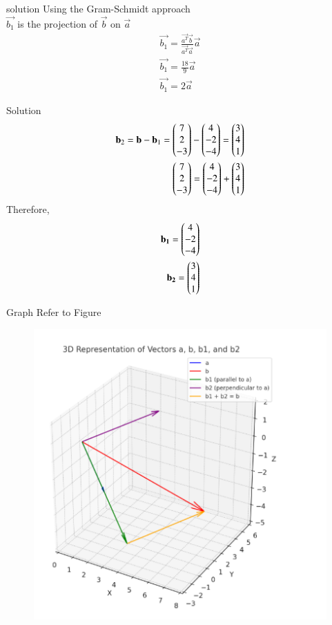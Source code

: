 \documentclass{beamer}
\begin{document}
\begin{frame}{solution}
Using the Gram-Schmidt approach\\
$\vec{{b}_1}$ is the projection of $\vec{b}$ on $\vec{a}$
\begin{align}
 \vec{{b}_1} = \frac{\vec{a^T} \vec{b}}{\vec{a^T} \vec{a}}  \vec{a}\\
\vec{{b}_1}=\frac{18}{9} \vec{a}\\
\vec{{b}_1}=2\vec{a}
\end{align}
\end{frame}
\begin{frame}{Solution}
\begin{align}
\mathbf{b}_2 = \mathbf{b} - \mathbf{b}_1 
= \begin{pmatrix}
7 \\ 2 \\ -3
\end{pmatrix}
-
\begin{pmatrix}
4 \\ -2 \\ -4
\end{pmatrix}
= \begin{pmatrix}
3 \\ 4 \\ 1\end{pmatrix}\\
 \begin{pmatrix}
7 \\ 2 \\ -3
\end{pmatrix}
=
\begin{pmatrix}
4 \\ -2 \\ -4
\end{pmatrix}
+
 \begin{pmatrix}
3 \\ 4 \\ 1\end{pmatrix}
\end{align}
Therefore,
\begin{align}
  \mathbf{{b}_1}=\begin{pmatrix}
                   4 \\ -2 \\ -4
                    \end{pmatrix}\\
\mathbf{{b}_2}= \begin{pmatrix}
             3 \\ 4 \\ 1  \end{pmatrix}    
\end{align}


\end{frame}

\begin{frame}{Graph}
   Refer to Figure

\begin{figure}[H]
\begin{center}
\includegraphics[width=0.6\columnwidth]{../figs/Graph3.png}
\end{center}
\caption{}
\label{fig:Fig}
\end{figure}  
\end{frame}
\end{document}
